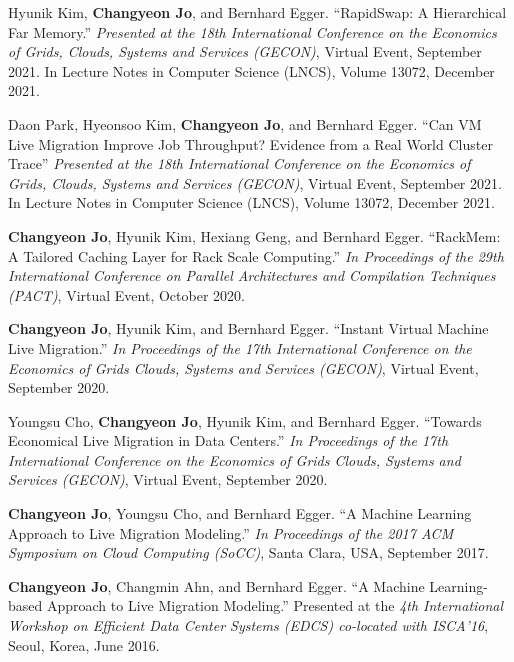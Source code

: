 \documentclass[margin]{res}
\begin{document}
\begin{resume}
\vspace{-0.5em}
Hyunik Kim, \textbf{Changyeon Jo}, and Bernhard Egger. ``RapidSwap: A Hierarchical Far Memory.'' \textit{Presented at the 18th International Conference on the Economics of Grids, Clouds, Systems and Services (GECON)}, Virtual Event, September 2021. In Lecture Notes in Computer Science (LNCS), Volume 13072, December 2021.

\vspace{-0.5em}
Daon Park, Hyeonsoo Kim, \textbf{Changyeon Jo}, and Bernhard Egger. ``Can VM Live Migration Improve Job Throughput? Evidence from a Real World Cluster Trace'' \textit{Presented at the 18th International Conference on the Economics of Grids, Clouds, Systems and Services (GECON)}, Virtual Event, September 2021. In Lecture Notes in Computer Science (LNCS), Volume 13072, December 2021.

\vspace{-0.5em}
\textbf{Changyeon Jo}, Hyunik Kim, Hexiang Geng, and Bernhard Egger. ``RackMem: A Tailored Caching Layer for Rack Scale Computing.'' \textit{In Proceedings of the 29th International Conference on Parallel Architectures and Compilation Techniques (PACT)}, Virtual Event, October 2020.

\vspace{-0.5em}
\textbf{Changyeon Jo}, Hyunik Kim, and Bernhard Egger. ``Instant Virtual Machine Live Migration.'' \textit{In Proceedings of the 17th International Conference on the Economics of Grids Clouds, Systems and Services (GECON)}, Virtual Event, September 2020.

\vspace{-0.5em}
Youngsu Cho, \textbf{Changyeon Jo}, Hyunik Kim, and Bernhard Egger. ``Towards Economical Live Migration in Data Centers.'' \textit{In Proceedings of the 17th International Conference on the Economics of Grids Clouds, Systems and Services (GECON)}, Virtual Event, September 2020.

\vspace{-0.5em}
\textbf{Changyeon Jo}, Youngsu Cho, and Bernhard Egger. ``A Machine Learning Approach to Live Migration Modeling.'' \textit{In Proceedings of the 2017 ACM Symposium on Cloud Computing (SoCC)}, Santa Clara, USA, September 2017.

\vspace{-0.5em}
\textbf{Changyeon Jo}, Changmin Ahn, and Bernhard Egger. ``A Machine Learning-based Approach to Live Migration Modeling.'' Presented at the \textit{4th International Workshop on Efficient Data Center Systems (EDCS) co-located with ISCA'16}, Seoul, Korea, June 2016.


\end{resume}
\end{document}
